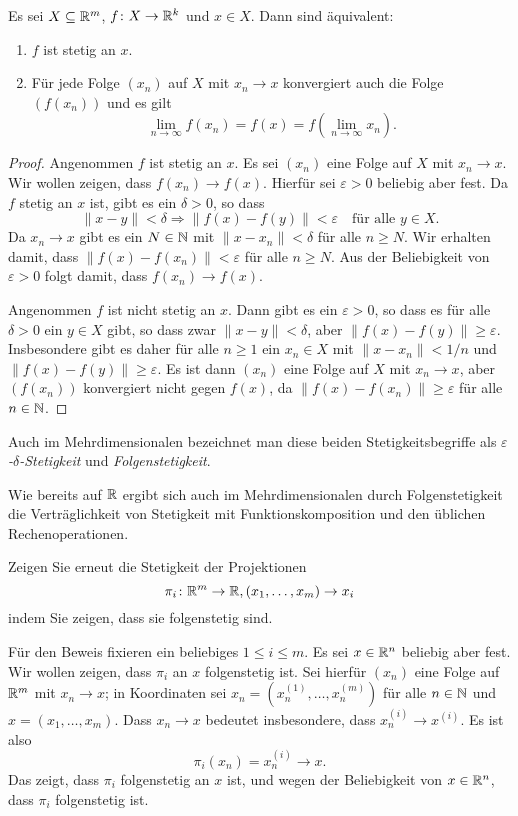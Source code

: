 \documentclass[a4paper,10pt]{article}
\begin{document}
\begin{lem}
 Es sei $X \subseteq \mathbb{R}^m$, $f \colon X \to \mathbb{R}^k$ und $x \in X$. Dann sind äquivalent:
 \begin{enumerate}
  \item
   $f$ ist stetig an $x$.
  \item
   Für jede Folge $(x_n)$ auf $X$ mit $x_n \to x$ konvergiert auch die Folge $(f(x_n))$ und es gilt
   \[
    \lim_{n \to \infty} f(x_n) = f(x) = f\left( \lim_{n \to \infty} x_n \right).
   \]
 \end{enumerate}
\end{lem}
\begin{proof}
 Angenommen $f$ ist stetig an $x$. Es sei $(x_n)$ eine Folge auf $X$ mit $x_n \to x$. Wir wollen zeigen, dass $f(x_n) \to f(x)$. Hierfür sei $\varepsilon > 0$ beliebig aber fest. Da $f$ stetig an $x$ ist, gibt es ein $\delta > 0$, so dass
 \[
  \|x-y\| < \delta \Rightarrow \|f(x) - f(y)\| < \varepsilon \quad \text{für alle $y \in X$}.
 \]
 Da $x_n \to x$ gibt es ein $N \in \mathbb{N}$ mit $\|x - x_n\| < \delta$ für alle $n \geq N$. Wir erhalten damit, dass $\|f(x) - f(x_n)\| < \varepsilon$ für alle $n \geq N$. Aus der Beliebigkeit von $\varepsilon > 0$ folgt damit, dass $f(x_n) \to f(x)$.
 
 Angenommen $f$ ist nicht stetig an $x$. Dann gibt es ein $\varepsilon > 0$, so dass es für alle $\delta > 0$ ein $y \in X$ gibt, so dass zwar $\|x-y\| < \delta$, aber $\|f(x)-f(y)\| \geq \varepsilon$. Insbesondere gibt es daher für alle $n \geq 1$ ein $x_n \in X$ mit $\|x - x_n\| < 1/n$ und $\|f(x) - f(y)\| \geq \varepsilon$. Es ist dann $(x_n)$ eine Folge auf $X$ mit $x_n \to x$, aber $(f(x_n))$ konvergiert nicht gegen $f(x)$, da $\|f(x) - f(x_n)\| \geq \varepsilon$ für alle $n \in \mathbb{N}$.
\end{proof}


Auch im Mehrdimensionalen bezeichnet man diese beiden Stetigkeitsbegriffe als \emph{$\varepsilon$-$\delta$-Stetigkeit} und \emph{Folgenstetigkeit}.


Wie bereits auf $\mathbb{R}$ ergibt sich auch im Mehrdimensionalen durch Folgenstetigkeit die Verträglichkeit von Stetigkeit mit Funktionskomposition und den üblichen Rechenoperationen.


\begin{question}
 Zeigen Sie erneut die Stetigkeit der Projektionen
 \[
  \pi_i \colon \mathbb{R}^m \to \mathbb{R}, (x_1, \dotsc, x_m) \to x_i
 \]
 indem Sie zeigen, dass sie folgenstetig sind.
\end{question}
\begin{solution}
 Für den Beweis fixieren ein beliebiges $1 \leq i \leq m$. Es sei $x \in \mathbb{R}^n$ beliebig aber fest. Wir wollen zeigen, dass $\pi_i$ an $x$ folgenstetig ist. Sei hierfür $(x_n)$ eine Folge auf $\mathbb{R}^m$ mit $x_n \to x$; in Koordinaten sei $x_n = (x^{(1)}_n, \dotsc, x^{(m)}_n)$ für alle $n \in \mathbb{N}$ und $x = (x_1, \dotsc, x_m)$. Dass $x_n \to x$ bedeutet insbesondere, dass $x^{(i)}_n \to x^{(i)}$. Es ist also
 \[
  \pi_i(x_n) = x^{(i)}_n \to x.
 \]
 Das zeigt, dass $\pi_i$ folgenstetig an $x$ ist, und wegen der Beliebigkeit von $x \in \mathbb{R}^n$, dass $\pi_i$ folgenstetig ist.
\end{solution}
\end{document}
